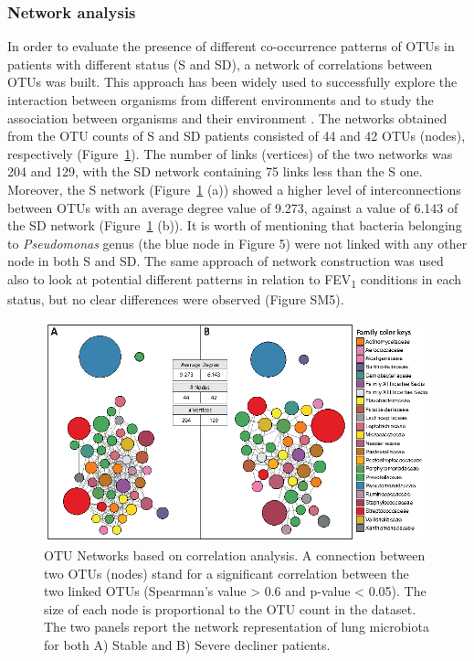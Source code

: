 \subsubsection{Network analysis}
In order to evaluate the presence of different co-occurrence patterns of OTUs in patients with different status (S and SD), a network of correlations between OTUs was built. This approach has been widely used to successfully explore the interaction between organisms from different environments and to study the association between organisms and their environment \cite{barberan2011using, chaffron2010global}. The networks obtained from the OTU counts of S and SD patients consisted of 44 and 42 OTUs (nodes), respectively (Figure~\ref{fig:fig516s}). The number of links (vertices) of the two networks was 204 and 129, with the SD network containing 75 links less than the S one. Moreover, the S network (Figure~\ref{fig:fig516s} (a)) showed a higher level of interconnections between OTUs with an average degree value of 9.273, against a value of 6.143 of the SD network (Figure~\ref{fig:fig516s} (b)). It is worth of mentioning that bacteria belonging to \textit{Pseudomonas }genus (the blue node in Figure 5) were not linked with any other node in both S and SD. The same approach of network construction was used also to look at potential different patterns in relation to FEV\textsubscript{1} conditions in each status, but no clear differences were observed (Figure SM5).\\%
\begin{figure}[!tb]
	\centering
	\includegraphics[width=1\textwidth]{./figures/Chapter_7/Figure_5_16s}
  	\caption{\label{fig:fig516s}OTU Networks based on correlation analysis. A connection between two OTUs (nodes) stand for a significant correlation between the two linked OTUs (Spearman's value {\textgreater} 0.6 and p-value {\textless} 0.05). The size of each node is proportional to the OTU count in the dataset. The two panels report the network representation of lung microbiota for both A) Stable and B) Severe decliner patients.}
\end{figure}%

